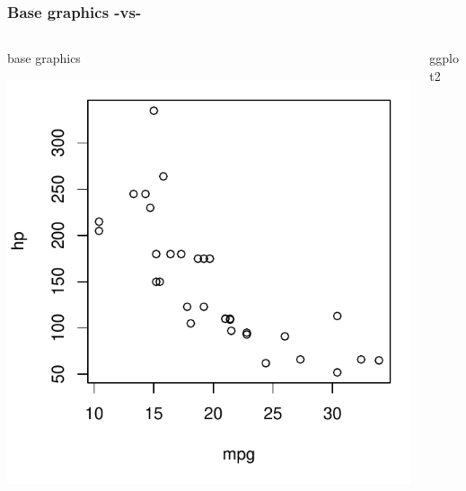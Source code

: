 \documentclass[12pt]{beamer}\usepackage[]{graphicx}\usepackage[]{color}
\newenvironment{knitrout}{}{} %
\begin{document}

\begin{frame}[fragile]
\frametitle{Base graphics -vs- }

\begin{columns}[t]
\begin{column}{0.4\textwidth}
\centerline{base graphics}
\begin{knitrout}\footnotesize
{}\color{fgcolor}

{\centering \includegraphics[width=1.05\linewidth,height=1.05\linewidth]{figure/unnamed-chunk-3-1} 

}



\end{knitrout}
\end{column}

\begin{column}{0.5\textwidth}
\centerline{ggplot2}
\begin{knitrout}\footnotesize
{}\color{fgcolor}


\end{knitrout}
\end{column}
\end{columns}
\end{frame}
\end{document}
